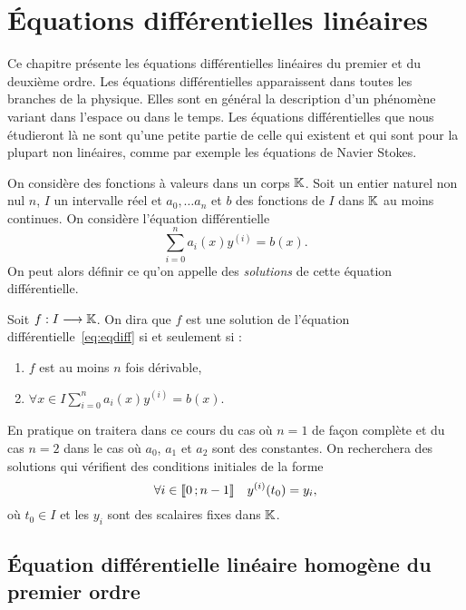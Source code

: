 \chapter{Équations différentielles linéaires}
\label{chap:equadiff}
\minitoc
\minilof
\minilot

Ce chapitre présente les équations différentielles linéaires du premier et du deuxième ordre. Les équations différentielles apparaissent dans toutes les branches de la physique. Elles sont en général la description d'un phénomène variant dans l'espace ou dans le temps. Les équations différentielles que nous étudieront là ne sont qu'une petite partie de celle qui existent et qui sont pour la plupart non linéaires, comme par exemple les équations de Navier Stokes.

On considère des fonctions à valeurs dans un corps $\mathbb{K}$. Soit un entier naturel non nul $n$, $I$ un intervalle réel et $a_0, \ldots a_n$ et $b$ des fonctions de $I$ dans $\mathbb{K}$ au moins continues. On considère l'équation différentielle
\begin{equation}
\sum_{i=0}^n a_i(x) y^{(i)} = b(x) \label{eq:eqdiff}.
\end{equation}
On peut alors définir ce qu'on appelle des \emph{solutions} de cette équation différentielle.
\begin{defdef}
Soit $f : I \longrightarrow \mathbb{K}$. On dira que $f$ est une solution de l'équation différentielle~\eqref{eq:eqdiff} si et seulement si :
\begin{enumerate}
\item $f$ est au moins $n$ fois dérivable,
\item $\forall x \in I \sum_{i=0}^n a_i(x) y^{(i)} = b(x)$.
\end{enumerate}
\end{defdef}
En pratique on traitera dans ce cours du cas où $n=1$ de façon complète et du cas $n=2$ dans le cas où $a_0$, $a_1$ et $a_2$ sont des constantes. On recherchera des solutions qui vérifient des conditions initiales de la forme 
\begin{equation}
 \forall i \in \mathopen{\llbracket}0\mathclose{}\mathpunct{};n-1\mathclose{\rrbracket} \quad y^{(i)}(t_0)=y_i,
\end{equation}
où $t_0 \in I$  et les $y_i$ sont des scalaires fixes dans $\mathbb{K}$.
\section{Équation différentielle linéaire homogène du premier ordre}
\label{sec:equadifflinhomog1}
